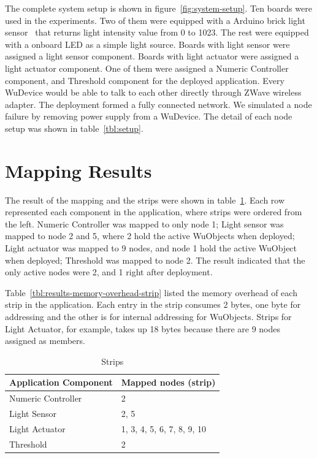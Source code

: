 The complete system setup is shown in figure~\ref{fig:system-setup}. Ten boards
were used in the experiments. Two of them were equipped with a Arduino brick
light sensor~\cite{brick} that returns light intensity value from 0 to 1023. The
rest were equipped with a onboard LED as a simple light source. Boards with
light sensor were assigned a light sensor component. Boards with light actuator
were assigned a light actuator component.  One of them were assigned a Numeric
Controller component, and Threshold component for the deployed application.
Every WuDevice would be able to talk to each other directly through ZWave
wireless adapter. The deployment formed a fully connected network. We simulated
a node failure by removing power supply from a WuDevice. The detail of each node
setup was shown in table~\ref{tbl:setup}.

\section{Mapping Results}

The result of the mapping and the strips were shown in
table~\ref{tbl:mapping-result}. Each row represented each component in the
application, where strips were ordered from the left. Numeric Controller was
mapped to only node 1; Light sensor was mapped to node 2 and 5, where 2 hold the
active WuObjects when deployed; Light actuator was mapped to 9 nodes, and node
1 hold the active WuObject when deployed; Threshold was mapped to node 2.  The
result indicated that the only active nodes were 2, and 1 right after deployment.

Table~\ref{tbl:results-memory-overhead-strip} listed the memory overhead of each
strip in the application. Each entry in the strip consumes 2 bytes, one byte for
addressing and the other is for internal addressing for WuObjects. Strips for
Light Actuator, for example, takes up 18 bytes because there are 9 nodes
assigned as members.

\begin{table}
\centering
\caption{Strips}
\label{tbl:mapping-result}
  \begin{tabular}{|l|l|}
  \hline
  \textbf{Application Component} & \textbf{Mapped nodes (strip)} \\
  \hline
  Numeric Controller & 2 \\
  \hline
  Light Sensor & 2, 5 \\
  \hline
  Light Actuator & 1, 3, 4, 5, 6, 7, 8, 9, 10 \\
  \hline
  Threshold & 2 \\
  \hline
  \end{tabular}
\end{table}

